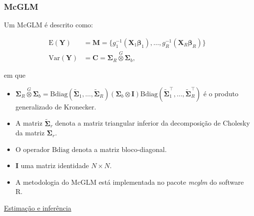 \documentclass[10pt,
  aspectratio=169,
  serif,
  mathserif,
  professionalfont,
  compress,
  handout,
  ]{beamer}\usepackage[]{graphicx}\usepackage[]{color}
\begin{document}
\begin{frame}
  \frametitle{McGLM}
  
  Um McGLM é descrito como:

\begin{equation}
\label{eq:mcglm}
      \begin{aligned}
        \mathrm{E}(\boldsymbol{Y}) &=
          \boldsymbol{M} =
            \{g_1^{-1}(\boldsymbol{X}_1 \boldsymbol{\beta}_1),
            \ldots,
            g_R^{-1}(\boldsymbol{X}_R \boldsymbol{\beta}_R)\}
          \\
        \mathrm{Var}(\boldsymbol{Y}) &=
          \boldsymbol{C} =
            \boldsymbol{\Sigma}_R \overset{G} \otimes
            \boldsymbol{\Sigma}_b,
      \end{aligned}
\end{equation}

em que 
  
  \begin{itemize}
    
    \itemsep 0.5ex
    
  \item $\boldsymbol{\Sigma}_R \overset{G} \otimes \boldsymbol{\Sigma}_b = \mathrm{Bdiag}(\tilde{\boldsymbol{\Sigma}}_1, \ldots, \tilde{\boldsymbol{\Sigma}}_R) (\boldsymbol{\Sigma}_b \otimes \boldsymbol{I}) \mathrm{Bdiag}(\tilde{\boldsymbol{\Sigma}}_1^\top, \ldots, \tilde{\boldsymbol{\Sigma}}_R^\top)$ é o produto generalizado de Kronecker. 
  
  \item A matriz $\tilde{\boldsymbol{\Sigma}}_r$ denota a matriz triangular inferior da decomposição de Cholesky da matriz ${\boldsymbol{\Sigma}}_r$. 
  
  \item O operador $\mathrm{Bdiag}$ denota a matriz bloco-diagonal. 
  
  \item $\boldsymbol{I}$ uma matriz identidade $N \times N$.
  
  \item A metodologia do McGLM está implementada no pacote \emph{mcglm} \cite{mcglm} do software R.

  \end{itemize}
  
\end{frame}


\begin{frame}[c, allowframebreaks]

\begin{center}

  {\normalsize \href{https://lineu96.github.io/st/}{Estimação e inferência}}
  
\end{center}

\end{frame}
\end{document}
